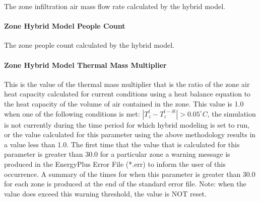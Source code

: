 The zone infiltration air mass flow rate calculated by the hybrid model.

\paragraph{Zone Hybrid Model People Count}\label{zone-infiltration-hybrid-model-people-count}

The zone people count calculated by the hybrid model.

\paragraph{Zone Hybrid Model Thermal Mass Multiplier}\label{zone-infiltration-hybrid-model-thermal-mass-multiplier}

This is the value of the thermal mass multiplier that is the ratio of the zone air heat capacity calculated for current conditions using a heat balance equation to the heat capacity of the volume of air contained in the zone.  This value is 1.0 when one of the following conditions is met: $|T_z^t - T_z^{t-\delta t}| > 0.05^{\circ}C$, the simulation is not currently during the time period for which hybrid modeling is set to run, or the value calculated for this parameter using the above methodology results in a value less than 1.0.  The first time that the value that is calculated for this parameter is greater than 30.0 for a particular zone a warning message is produced in the EnergyPlus Error File (*.err) to inform the user of this occurrence.  A summary of the times for when this parameter is greater than 30.0 for each zone is produced at the end of the standard error file.  Note: when the value does exceed this warning threshold, the value is NOT reset.
